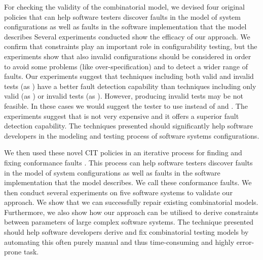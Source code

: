 \begin{tikzborder}{\cite{Gargantini16:validation}}
\begin{tikzborder}{\cite{gargantini_combinatorial_2017}}
\begin{tikzborder}{\cite{garn2019}}
For checking the validity of the combinatorial model, we devised four original policies that can help software testers discover faults in the model of system configurations as well as faults in the software implementation that the model describes \cite{Gargantini16:validation} Several experiments conducted show the efficacy of our approach.   We confirm that constraints play an important role in configurability testing, but the experiments show that also invalid configurations should be considered in order to avoid some problems (like over-specification) and to detect a wider range of faults. 
Our experiments suggest that techniques including both valid and invalid tests (as \cucv) have a better fault detection capability than techniques including only valid (as \ccit) or invalid tests (as \cv). However, producing invalid tests may be not feasible. In these cases we would suggest the tester to use \CCi instead of \ic and \ccit. The experiments suggest that \CCi is not very expensive and it offers a superior fault detection capability. The techniques presented should significantly help software developers in the modeling and testing process of software systems configurations.

We then used these novel CIT policies in an iterative process for finding and fixing conformance faults \cite{gargantini_combinatorial_2017}. This process can help software testers discover faults in the model of system configurations as well as faults in the software implementation that the model describes. We call these conformance faults.
We then conduct several experiments on five software systems to validate our approach. We show that we can successfully repair existing combinatorial models. Furthermore, we also show how our approach can be utilised to derive constraints between parameters of large complex software systems. The technique presented should help software developers derive and fix combinatorial testing models by automating this often purely manual and thus time-consuming and highly error-prone task.


\end{tikzborder}
\end{tikzborder}
\end{tikzborder}
